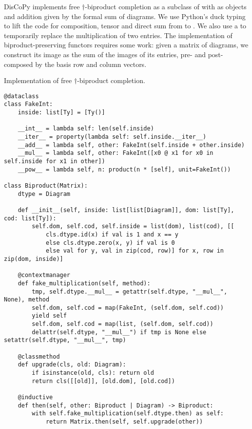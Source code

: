 DisCoPy implements free $\dagger$-biproduct completion as a subclass of  with  as objects and addition given by the formal sum of diagrams.
We use Python's duck typing to lift the code for composition, tensor and direct sum from  to .
We also use a  to temporarily replace the multiplication of two  entries.
The implementation of biproduct-preserving functors requires some work: given a matrix of diagrams, we construct its image as the sum of the images of its entries, pre- and post-composed by the basis row and column vectors.

\begin{python}
{\normalfont Implementation of free $\dagger$-biproduct completion.}

\begin{verbatim}
@dataclass
class FakeInt:
    inside: list[Ty] = [Ty()]

    __int__ = lambda self: len(self.inside)
    __iter__ = property(lambda self: self.inside.__iter__)
    __add__ = lambda self, other: FakeInt(self.inside + other.inside)
    __mul__ = lambda self, other: FakeInt([x0 @ x1 for x0 in self.inside for x1 in other])
    __pow__ = lambda self, n: product(n * [self], unit=FakeInt())

class Biproduct(Matrix):
    dtype = Diagram

    def __init__(self, inside: list[list[Diagram]], dom: list[Ty], cod: list[Ty]):
        self.dom, self.cod, self.inside = list(dom), list(cod), [[
            cls.dtype.id(x) if val is 1 and x == y
            else cls.dtype.zero(x, y) if val is 0
            else val for y, val in zip(cod, row)] for x, row in zip(dom, inside)]

    @contextmanager
    def fake_multiplication(self, method):
        tmp, self.dtype.__mul__ = getattr(self.dtype, "__mul__", None), method
        self.dom, self.cod = map(FakeInt, (self.dom, self.cod))
        yield self
        self.dom, self.cod = map(list, (self.dom, self.cod))
        delattr(self.dtype, "__mul__") if tmp is None else setattr(self.dtype, "__mul__", tmp)

    @classmethod
    def upgrade(cls, old: Diagram):
        if isinstance(old, cls): return old
        return cls([[old]], [old.dom], [old.cod])

    @inductive
    def then(self, other: Biproduct | Diagram) -> Biproduct:
        with self.fake_multiplication(self.dtype.then) as self:
            return Matrix.then(self, self.upgrade(other))


\end{verbatim}
\end{python}
